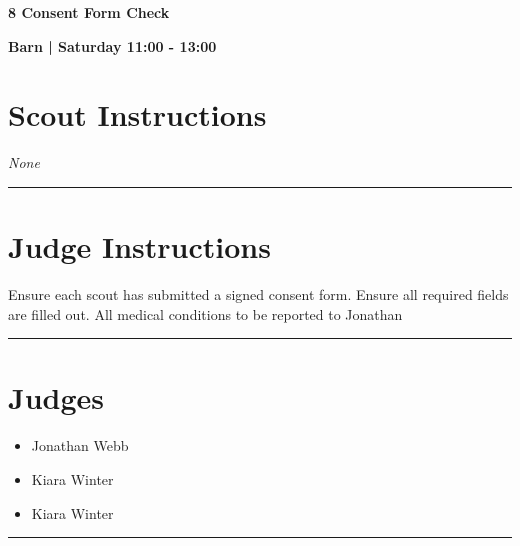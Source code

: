 \documentclass[10pt]{article}
\newcommand{\newtitle}[1]{\begin{center}{\Huge\bfseries #1 }\\ \vspace{5mm}\end{center}}
\newcommand{\newsubtitle}[1]{\begin{center}{\color{grey}\Large\bfseries #1 }\\ \vspace{5mm}\end{center}}
\begin{document}
	\vspace{1cm}


	\clearpage
		\newtitle{8 Consent Form Check }
	\newsubtitle{Barn | Saturday 11:00 - 13:00}
		\setcounter{section}{7}
	\section*{Scout Instructions}
		\textit{None}
	
	\vspace{0.5cm}
	\hrule
	\vspace{0.5cm}

		\section*{Judge Instructions}
		Ensure each scout has submitted a signed consent form. Ensure all required fields are filled out. All medical conditions to be reported to Jonathan


\vspace{0.5cm}
	\hrule
	\vspace{0.5cm}
		\section*{\faUsers \: Judges}

		

	\begin{multicols}{2}

		\begin{itemize}
									\item Jonathan Webb
									\item Kiara Winter
						\end{itemize}

		\vfill\null
		\columnbreak

		\begin{itemize}
									\item Kiara Winter
						\end{itemize}

		\vfill\null

		\end{multicols}



			\vspace{0.5cm}
	\hrule
	\vspace{0.5cm}
\end{document}
